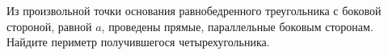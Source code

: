\begin{ex}
	\begin{condition}
		Из произвольной точки основания равнобедренного треугольника с боковой стороной, равной \( a \), проведены прямые, параллельные боковым сторонам. Найдите периметр получившегося четырехугольника. 
	\end{condition}
\end{ex}